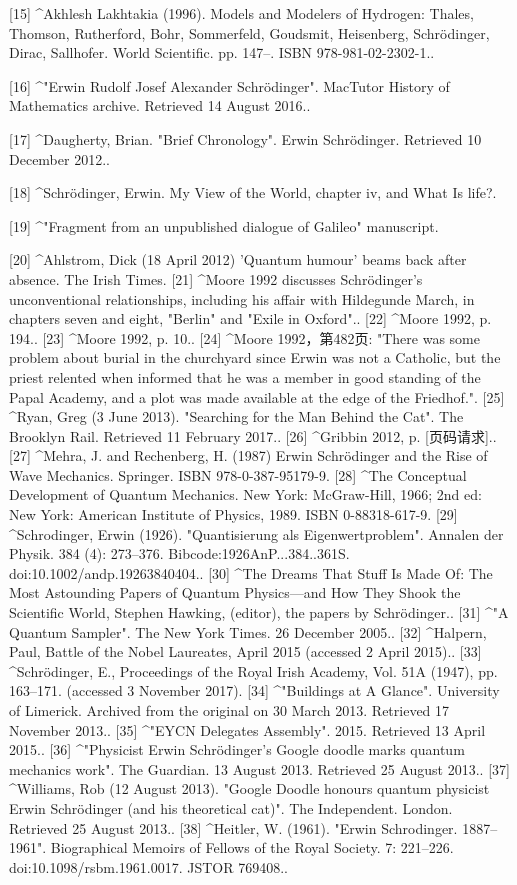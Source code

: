[15]
^Akhlesh Lakhtakia (1996). Models and Modelers of Hydrogen: Thales, Thomson, Rutherford, Bohr, Sommerfeld, Goudsmit, Heisenberg, Schrödinger, Dirac, Sallhofer. World Scientific. pp. 147–. ISBN 978-981-02-2302-1..

[16]
^"Erwin Rudolf Josef Alexander Schrödinger". MacTutor History of Mathematics archive. Retrieved 14 August 2016..

[17]
^Daugherty, Brian. "Brief Chronology". Erwin Schrödinger. Retrieved 10 December 2012..

[18]
^Schrödinger, Erwin. My View of the World, chapter iv, and What Is life?.

[19]
^"Fragment from an unpublished dialogue of Galileo" manuscript.

[20]
^Ahlstrom, Dick (18 April 2012) 'Quantum humour' beams back after absence. The Irish Times.
[21]
^Moore 1992 discusses Schrödinger's unconventional relationships, including his affair with Hildegunde March, in chapters seven and eight, "Berlin" and "Exile in Oxford"..
[22]
^Moore 1992, p. 194..
[23]
^Moore 1992, p. 10..
[24]
^Moore 1992，第482页: "There was some problem about burial in the churchyard since Erwin was not a Catholic, but the priest relented when informed that he was a member in good standing of the Papal Academy, and a plot was made available at the edge of the Friedhof.".
[25]
^Ryan, Greg (3 June 2013). "Searching for the Man Behind the Cat". The Brooklyn Rail. Retrieved 11 February 2017..
[26]
^Gribbin 2012, p. [页码请求]..
[27]
^Mehra, J. and Rechenberg, H. (1987) Erwin Schrödinger and the Rise of Wave Mechanics. Springer. ISBN 978-0-387-95179-9.
[28]
^The Conceptual Development of Quantum Mechanics. New York: McGraw-Hill, 1966; 2nd ed: New York: American Institute of Physics, 1989. ISBN 0-88318-617-9.
[29]
^Schrodinger, Erwin (1926). "Quantisierung als Eigenwertproblem". Annalen der Physik. 384 (4): 273–376. Bibcode:1926AnP...384..361S. doi:10.1002/andp.19263840404..
[30]
^The Dreams That Stuff Is Made Of: The Most Astounding Papers of Quantum Physics—and How They Shook the Scientific World, Stephen Hawking, (editor), the papers by Schrödinger..
[31]
^"A Quantum Sampler". The New York Times. 26 December 2005..
[32]
^Halpern, Paul, Battle of the Nobel Laureates, April 2015 (accessed 2 April 2015)..
[33]
^Schrödinger, E., Proceedings of the Royal Irish Academy, Vol. 51A (1947), pp. 163–171. (accessed 3 November 2017).
[34]
^"Buildings at A Glance". University of Limerick. Archived from the original on 30 March 2013. Retrieved 17 November 2013..
[35]
^"EYCN Delegates Assembly". 2015. Retrieved 13 April 2015..
[36]
^"Physicist Erwin Schrödinger's Google doodle marks quantum mechanics work". The Guardian. 13 August 2013. Retrieved 25 August 2013..
[37]
^Williams, Rob (12 August 2013). "Google Doodle honours quantum physicist Erwin Schrödinger (and his theoretical cat)". The Independent. London. Retrieved 25 August 2013..
[38]
^Heitler, W. (1961). "Erwin Schrodinger. 1887–1961". Biographical Memoirs of Fellows of the Royal Society. 7: 221–226. doi:10.1098/rsbm.1961.0017. JSTOR 769408..